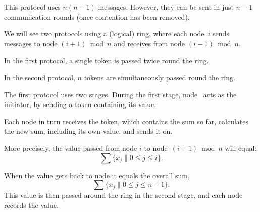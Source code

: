 \documentclass[notes,color]{sepslide0}
\def\set#1{\{#1\}}
\begin{document}

\begin{slide}

This protocol uses $n(n-1)$ messages.  However, they can be sent in just $n-1$
communication rounds (once contention has been removed).
\end{slide}


\begin{slide}

We will see two protocols using a (logical) ring, where each node~$i$ sends
messages to node $(i+1) \bmod n$ and receives from node $(i-1) \bmod n$.
\begin{center}
\end{center}

In the first protocol, a single token is passed twice round the ring.  

In the second protocol, $n$ tokens are simultaneously passed round the ring. 
\end{slide}


\begin{slide}

The first protocol uses two stages.  During the first stage, node~
acts as the initiator, by sending a token containing its value.  

Each node in turn receives the token, which contains the sum so far,
calculates the new sum, including its own value, and sends it on.

More precisely, the value passed from node $i$ to node~$(i+1)
\bmod n$ will equal:
%
\[
\sum \set{x_j \| 0 \le j \le i}.
\]

When the value gets back to node  it equals the overall sum, 
\[
\sum \set{x_j \| 0 \le j \le n-1}.
\]
This value is then passed around the ring in the second stage, and each node
records the value.
\end{slide}

\end{document}
